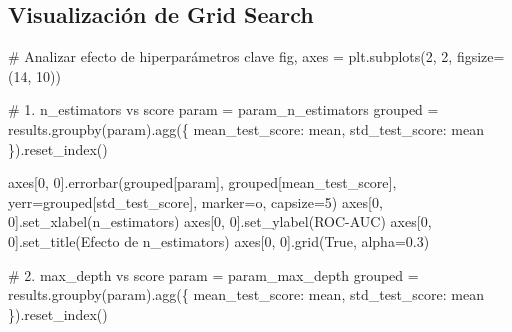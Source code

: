 \documentclass[
  doc,
  floatsintext,
  longtable,
  a4paper,
  nolmodern,
  notxfonts,
  notimes,
  12pt,
  colorlinks=true,linkcolor=blue,citecolor=blue,urlcolor=blue]{apa7}
\newenvironment{Shaded}{\begin{snugshade}}{\end{snugshade}}
\newcommand{\CommentTok}[1]{\textcolor[rgb]{0.37,0.37,0.37}{#1}}
\newcommand{\DecValTok}[1]{\textcolor[rgb]{0.68,0.00,0.00}{#1}}
\newcommand{\FloatTok}[1]{\textcolor[rgb]{0.68,0.00,0.00}{#1}}
\newcommand{\NormalTok}[1]{\textcolor[rgb]{0.00,0.23,0.31}{#1}}
\newcommand{\OperatorTok}[1]{\textcolor[rgb]{0.37,0.37,0.37}{#1}}
\newcommand{\StringTok}[1]{\textcolor[rgb]{0.13,0.47,0.30}{#1}}
\newcommand{\VariableTok}[1]{\textcolor[rgb]{0.07,0.07,0.07}{#1}}
\begin{document}
\subsection{Visualización de Grid
Search}\label{visualizaciuxf3n-de-grid-search}

\begin{Shaded}
\begin{Highlighting}[]
\CommentTok{\# Analizar efecto de hiperparámetros clave}
\NormalTok{fig, axes }\OperatorTok{=}\NormalTok{ plt.subplots(}\DecValTok{2}\NormalTok{, }\DecValTok{2}\NormalTok{, figsize}\OperatorTok{=}\NormalTok{(}\DecValTok{14}\NormalTok{, }\DecValTok{10}\NormalTok{))}

\CommentTok{\# 1. n\_estimators vs score}
\NormalTok{param }\OperatorTok{=} \StringTok{\textquotesingle{}param\_n\_estimators\textquotesingle{}}
\NormalTok{grouped }\OperatorTok{=}\NormalTok{ results.groupby(param).agg(\{}
    \StringTok{\textquotesingle{}mean\_test\_score\textquotesingle{}}\NormalTok{: }\StringTok{\textquotesingle{}mean\textquotesingle{}}\NormalTok{,}
    \StringTok{\textquotesingle{}std\_test\_score\textquotesingle{}}\NormalTok{: }\StringTok{\textquotesingle{}mean\textquotesingle{}}
\NormalTok{\}).reset\_index()}

\NormalTok{axes[}\DecValTok{0}\NormalTok{, }\DecValTok{0}\NormalTok{].errorbar(grouped[param], grouped[}\StringTok{\textquotesingle{}mean\_test\_score\textquotesingle{}}\NormalTok{],}
\NormalTok{                    yerr}\OperatorTok{=}\NormalTok{grouped[}\StringTok{\textquotesingle{}std\_test\_score\textquotesingle{}}\NormalTok{], marker}\OperatorTok{=}\StringTok{\textquotesingle{}o\textquotesingle{}}\NormalTok{, capsize}\OperatorTok{=}\DecValTok{5}\NormalTok{)}
\NormalTok{axes[}\DecValTok{0}\NormalTok{, }\DecValTok{0}\NormalTok{].set\_xlabel(}\StringTok{\textquotesingle{}n\_estimators\textquotesingle{}}\NormalTok{)}
\NormalTok{axes[}\DecValTok{0}\NormalTok{, }\DecValTok{0}\NormalTok{].set\_ylabel(}\StringTok{\textquotesingle{}ROC{-}AUC\textquotesingle{}}\NormalTok{)}
\NormalTok{axes[}\DecValTok{0}\NormalTok{, }\DecValTok{0}\NormalTok{].set\_title(}\StringTok{\textquotesingle{}Efecto de n\_estimators\textquotesingle{}}\NormalTok{)}
\NormalTok{axes[}\DecValTok{0}\NormalTok{, }\DecValTok{0}\NormalTok{].grid(}\VariableTok{True}\NormalTok{, alpha}\OperatorTok{=}\FloatTok{0.3}\NormalTok{)}

\CommentTok{\# 2. max\_depth vs score}
\NormalTok{param }\OperatorTok{=} \StringTok{\textquotesingle{}param\_max\_depth\textquotesingle{}}
\NormalTok{grouped }\OperatorTok{=}\NormalTok{ results.groupby(param).agg(\{}
    \StringTok{\textquotesingle{}mean\_test\_score\textquotesingle{}}\NormalTok{: }\StringTok{\textquotesingle{}mean\textquotesingle{}}\NormalTok{,}
    \StringTok{\textquotesingle{}std\_test\_score\textquotesingle{}}\NormalTok{: }\StringTok{\textquotesingle{}mean\textquotesingle{}}
\NormalTok{\}).reset\_index()}


\end{Highlighting}
\end{Shaded}
\end{document}
